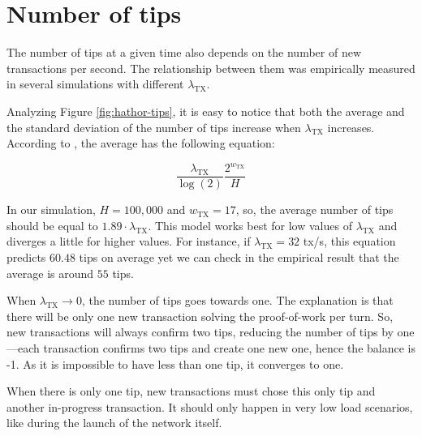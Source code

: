 \section{Number of tips}

The number of tips at a given time also depends on the number of new transactions per second. The relationship between them was empirically measured in several simulations with different $\lambda_\text{TX}$.

Analyzing Figure \ref{fig:hathor-tips}, it is easy to notice that both the average and the standard deviation of the number of tips increase when $\lambda_\text{TX}$ increases. According to \citet{tangle2016}, the average has the following equation:

$$\frac{\lambda_\text{TX}}{\log(2)} \frac{2^{w_\text{TX}}}{H}$$

In our simulation, $H = 100,000$ and $w_\text{TX} = 17$, so, the average number of tips should be equal to $1.89 \cdot \lambda_\text{TX}$. This model works best for low values of $\lambda_\text{TX}$ and diverges a little for higher values. For instance, if $\lambda_\text{TX} = 32$ tx/s, this equation predicts $60.48$ tips on average yet we can check in the empirical result that the average is around $55$ tips.

When $\lambda_\text{TX} \rightarrow 0$, the number of tips goes towards one. The explanation is that there will be only one new transaction solving the proof-of-work per turn. So, new transactions will always confirm two tips, reducing the number of tips by one---each transaction confirms two tips and create one new one, hence the balance is -1. As it is impossible to have less than one tip, it converges to one.

When there is only one tip, new transactions must chose this only tip and another in-progress transaction. It should only happen in very low load scenarios, like during the launch of the network itself.


